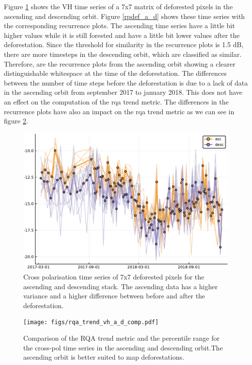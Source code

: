 \documentclass{article}
\begin{document}
Figure \ref{ts_a_d} shows the VH time series of a 7x7 matrix of deforested pixels in the ascending and descending orbit.
Figure \ref{rpdef_a_d} shows these time series with the corresponding recurrence plots.
The ascending time series have a little bit higher values while it is still forested
and have a little bit lower values after the deforestation.
Since the threshold for similarity in the recurrence plots is 1.5 dB,
there are more timesteps in the descending orbit, which are classified as similar.
Therefore, are the recurrence plots from the ascending orbit showing a clearer distinguishable whitespace at the time of the deforestation.
The differences between the number of time steps before the deforestation is due to a lack of data in the ascending orbit from september 2017 to january 2018.
This does not have an effect on the computation of the rqa trend metric.
The differences in the recurrence plots have also an impact on the rqa trend metric as we can see in figure \ref{comp_vh_a_d}.




\begin{figure}
  \includegraphics[width=\textwidth]{figs/vh_a_d_timeseries.pdf}
  \caption{Cross polarisation time series of 7x7 deforested pixels for the ascending and descending stack.
            The ascending data has a higher variance and a higher difference between before and after the deforestation.
            }
  \label{ts_a_d}
\end{figure}

\begin{figure}
  \texttt{[image: figs/rqa\_trend\_vh\_a\_d\_comp.pdf]}
  \caption{Comparison of the RQA trend metric and the percentile range for the cross-pol time series in the ascending and descending orbit.The ascending orbit is better suited to map deforestations.}
  \label{comp_vh_a_d}
\end{figure}
\end{document}
